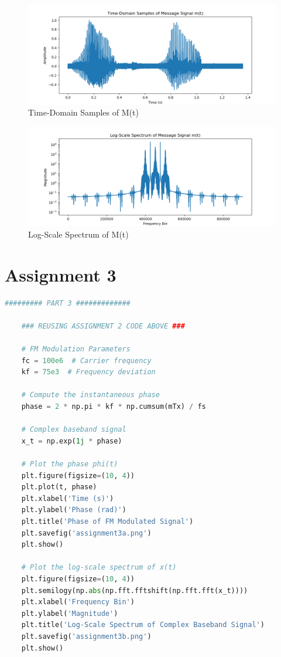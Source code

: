 \documentclass[
	letterpaper, %
	10pt, %
]{CSUniSchoolLabReport}
\begin{document}
\begin{figure}[H] %
	\centering %
	\includegraphics[width=1.2\textwidth]{assignment2a.png} %
	\caption{Time-Domain Samples of M(t)}
	\label{fig:block}
\end{figure}

\begin{figure}[H] %
	\centering %
	\includegraphics[width=1.2\textwidth]{assignment2b.png} %
	\caption{Log-Scale Spectrum of M(t)}
	\label{fig:block}
\end{figure}

\section{Assignment 3}

\begin{lstlisting}[language=Python]
	######### PART 3 #############
	
	### REUSING ASSIGNMENT 2 CODE ABOVE ###
	
	# FM Modulation Parameters
	fc = 100e6  # Carrier frequency
	kf = 75e3  # Frequency deviation
	
	# Compute the instantaneous phase
	phase = 2 * np.pi * kf * np.cumsum(mTx) / fs
	
	# Complex baseband signal
	x_t = np.exp(1j * phase)
	
	# Plot the phase phi(t)
	plt.figure(figsize=(10, 4))
	plt.plot(t, phase)
	plt.xlabel('Time (s)')
	plt.ylabel('Phase (rad)')
	plt.title('Phase of FM Modulated Signal')
	plt.savefig('assignment3a.png')
	plt.show()
	
	# Plot the log-scale spectrum of x(t)
	plt.figure(figsize=(10, 4))
	plt.semilogy(np.abs(np.fft.fftshift(np.fft.fft(x_t))))
	plt.xlabel('Frequency Bin')
	plt.ylabel('Magnitude')
	plt.title('Log-Scale Spectrum of Complex Baseband Signal')
	plt.savefig('assignment3b.png')
	plt.show()

\end{lstlisting}
\end{document}
